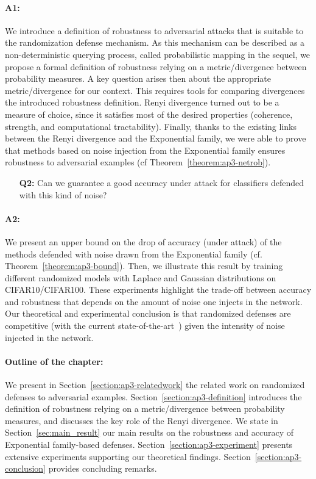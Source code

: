 \paragraph{A1:}
We introduce a definition of robustness to adversarial attacks that is suitable to the randomization defense mechanism.
As this mechanism can be  described as a non-deterministic querying process, called probabilistic mapping in the sequel, we propose a formal definition of robustness relying on a metric/divergence between probability measures.
A key question arises then about the appropriate metric/divergence for our context.
This requires tools for comparing divergences \wrt the introduced robustness definition.
Renyi divergence turned out to be a measure of choice, since it satisfies most of the desired properties  (coherence, strength, and computational tractability).
Finally, thanks to the existing links between the Renyi divergence and the Exponential family, we were able to prove  that methods based on noise injection from the Exponential family  ensures robustness to adversarial examples (cf Theorem~\ref{theorem:ap3-netrob}). 
\begin{itemize}
    \item[\textbf{Q2:}] Can we guarantee a good accuracy under attack for classifiers defended with this kind of noise? 
\end{itemize}

\paragraph{A2:}
We present an upper bound on  the drop of accuracy (under attack) of the methods defended with noise drawn from the Exponential family (cf. Theorem~\ref{theorem:ap3-bound}).
Then, we illustrate this result by training different randomized models with Laplace and Gaussian distributions on CIFAR10/CIFAR100.
These experiments highlight the trade-off between accuracy and robustness that depends on the amount of noise one injects in the network.
Our theoretical and experimental conclusion is that randomized defenses are competitive (with the current state-of-the-art~\cite{madry2018towards}) given the intensity of noise injected in the network. 

\paragraph{Outline of the chapter:}
We present in Section~\ref{section:ap3-relatedwork} the related work on randomized defenses to adversarial examples.
Section~\ref{section:ap3-definition} introduces the definition of robustness relying on a metric/divergence between probability measures, and discusses the key role of the Renyi divergence.
We state in Section~\ref{sec:main_result} our main results on the robustness and accuracy of Exponential family-based defenses.
Section~\ref{section:ap3-experiment} presents extensive experiments supporting our theoretical findings.
Section~\ref{section:ap3-conclusion} provides concluding remarks.

